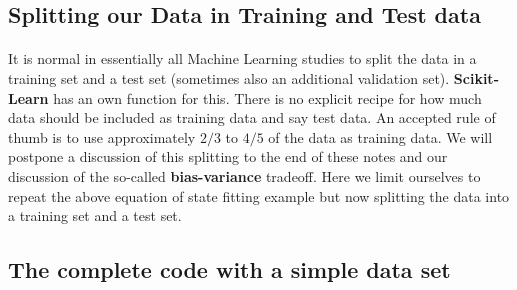 \documentclass[%
oneside,                 %
final,                   %
10pt]{article}
\begin{document}
\subsection*{Splitting our Data in Training and Test data}


\paragraph{}

It is normal in essentially all Machine Learning studies to split the
data in a training set and a test set (sometimes also an additional
validation set).  \textbf{Scikit-Learn} has an own function for this. There
is no explicit recipe for how much data should be included as training
data and say test data.  An accepted rule of thumb is to use
approximately $2/3$ to $4/5$ of the data as training data. We will
postpone a discussion of this splitting to the end of these notes and
our discussion of the so-called \textbf{bias-variance} tradeoff. Here we
limit ourselves to repeat the above equation of state fitting example
but now splitting the data into a training set and a test set.



\subsection*{The complete code with a simple data set}
\end{document}
